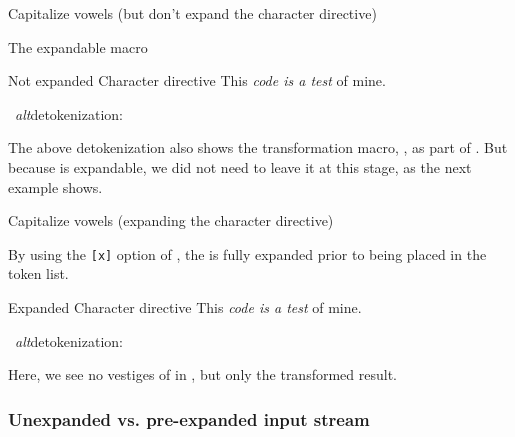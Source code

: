 \documentclass[10pt]{article}
\def\altdecytoks{\par\medskip\begingroup\noindent\macname{cytoks}
  \ \textit{alt}detokenization:\\\raggedright\footnotesize\ttfamily
  \expandafter\altdetokenize\expandafter{\the\cytoks}\normalsize\par
  \endgroup\medskip}
\begin{document}
\noindent\begin{minipage}[t]{\textwidth}
Capitalize vowels (but don't expand the character directive)

\begingroup

\begin{exampleC}[]{The expandable macro}
\newcommand\vowelcap[1]{%
  \ifx a#1A\else
  \ifx e#1E\else
  \ifx i#1I\else
  \ifx o#1O\else
  \ifx u#1U\else
  #1\fi\fi\fi\fi\fi
}
\end{exampleC}

\begin{exampleA}[lefthand width=8.3cm]
  {Not expanded Character directive}
\tokcycle
{}
{}
{}
{}{%
  This \textit{code \textup{is} a test} of mine.}
\the\cytoks
\end{exampleA}

\altdecytoks 

The above detokenization also shows the transformation macro,
  , as part of .
But because  is expandable, we did not need to
  leave it at this stage, as the next example shows.

\par\noindent\hrulefill\medskip
\endgroup
\end{minipage}

\begin{minipage}[t]{\textwidth}
\begingroup
Capitalize vowels (expanding the character directive)

\medskip
By using the \texttt{[x]} option of , the 
   is fully expanded prior to being placed in
  the  token list.


\begin{exampleA}[lefthand width=8.3cm]
  {Expanded Character directive}
\tokcycle
{}
{}
{}
{}{%
  This \textit{code \textup{is} a test} of mine.}
\the\cytoks
\end{exampleA}

\altdecytoks

Here, we see no vestiges of  in , 
  but only the transformed result.
\endgroup
\end{minipage}

\enlargethispage{12pt}
\subsubsection{Unexpanded vs. pre-expanded input stream}
\end{document}
